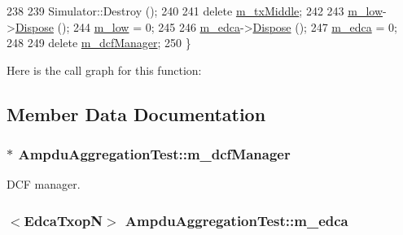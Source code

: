 \begin{DoxyCode}
238 
239   Simulator::Destroy ();
240 
241   \textcolor{keyword}{delete} \hyperlink{classAmpduAggregationTest_a69145cfecbe5625743bb6165b99e5069}{m\_txMiddle};
242 
243   \hyperlink{classAmpduAggregationTest_a65f2d8fbd8b46a92ace2c371d2a091d9}{m\_low}->\hyperlink{classns3_1_1Object_aa90ae598863f6c251cdab3c3722afdaf}{Dispose} ();
244   \hyperlink{classAmpduAggregationTest_a65f2d8fbd8b46a92ace2c371d2a091d9}{m\_low} = 0;
245 
246   \hyperlink{classAmpduAggregationTest_aa073b38b49ac92944de917cd25fe46f4}{m\_edca}->\hyperlink{classns3_1_1Object_aa90ae598863f6c251cdab3c3722afdaf}{Dispose} ();
247   \hyperlink{classAmpduAggregationTest_aa073b38b49ac92944de917cd25fe46f4}{m\_edca} = 0;
248 
249   \textcolor{keyword}{delete} \hyperlink{classAmpduAggregationTest_ab4228ccddddc9bc922b9eca47cf90054}{m\_dcfManager};
250 \}
\end{DoxyCode}


Here is the call graph for this function\+:




\subsection{Member Data Documentation}
\subsubsection[{\texorpdfstring{m\+\_\+dcf\+Manager}{m_dcfManager}}]{$\ast$ Ampdu\+Aggregation\+Test\+::m\+\_\+dcf\+Manager\hspace{0.3cm}{\ttfamily [private]}}\hypertarget{classAmpduAggregationTest_ab4228ccddddc9bc922b9eca47cf90054}{}\label{classAmpduAggregationTest_ab4228ccddddc9bc922b9eca47cf90054}


D\+CF manager. 

\subsubsection[{\texorpdfstring{m\+\_\+edca}{m_edca}}]{$<${\bf Edca\+TxopN}$>$ Ampdu\+Aggregation\+Test\+::m\+\_\+edca\hspace{0.3cm}{\ttfamily [private]}}\hypertarget{classAmpduAggregationTest_aa073b38b49ac92944de917cd25fe46f4}{}\label{classAmpduAggregationTest_aa073b38b49ac92944de917cd25fe46f4}


